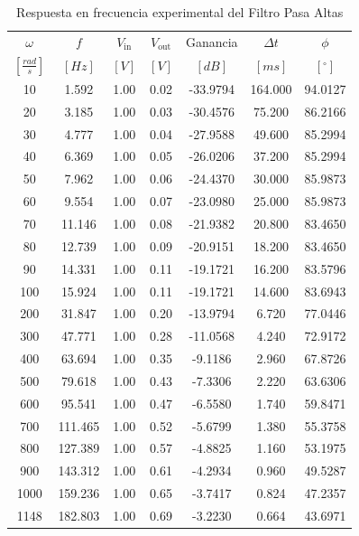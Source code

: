 \documentclass{article}
\begin{document}
\begin{table}[H]
\centering
\caption{Respuesta en frecuencia experimental del Filtro Pasa Altas}
\label{tab:filtro_pasaaltas}
\begin{tabular}{ccccccc}
    \toprule
\(\omega\) & \(f\) & \(V_{\text{in}}\) & \(V_{\text{out}}\) & Ganancia & \(\Delta t\) & \(\phi\) \\
\([\frac{rad}{s}]\) & $[Hz]$ & $[V]$ & $[V]$ & $[dB]$ & $[ms]$ & \ $[^\circ]$\ \\
\midrule
10    &    1.592 & 1.00 & 0.02 & -33.9794 & 164.000 & 94.0127 \\
20    &    3.185 & 1.00 & 0.03 & -30.4576 &  75.200 & 86.2166 \\
30    &    4.777 & 1.00 & 0.04 & -27.9588 &  49.600 & 85.2994 \\
40    &    6.369 & 1.00 & 0.05 & -26.0206 &  37.200 & 85.2994 \\
50    &    7.962 & 1.00 & 0.06 & -24.4370 &  30.000 & 85.9873 \\
60    &    9.554 & 1.00 & 0.07 & -23.0980 &  25.000 & 85.9873 \\
70    &   11.146 & 1.00 & 0.08 & -21.9382 &  20.800 & 83.4650 \\
80    &   12.739 & 1.00 & 0.09 & -20.9151 &  18.200 & 83.4650 \\
90    &   14.331 & 1.00 & 0.11 & -19.1721 &  16.200 & 83.5796 \\
100   &   15.924 & 1.00 & 0.11 & -19.1721 &  14.600 & 83.6943 \\
200   &   31.847 & 1.00 & 0.20 & -13.9794 &   6.720 & 77.0446 \\
300   &   47.771 & 1.00 & 0.28 & -11.0568 &   4.240 & 72.9172 \\
400   &   63.694 & 1.00 & 0.35 &  -9.1186 &   2.960 & 67.8726 \\
500   &   79.618 & 1.00 & 0.43 &  -7.3306 &   2.220 & 63.6306 \\
600   &   95.541 & 1.00 & 0.47 &  -6.5580 &   1.740 & 59.8471 \\
700   &  111.465 & 1.00 & 0.52 &  -5.6799 &   1.380 & 55.3758 \\
800   &  127.389 & 1.00 & 0.57 &  -4.8825 &   1.160 & 53.1975 \\
900   &  143.312 & 1.00 & 0.61 &  -4.2934 &   0.960 & 49.5287 \\
1000  &  159.236 & 1.00 & 0.65 &  -3.7417 &   0.824 & 47.2357 \\
1148  &  182.803 & 1.00 & 0.69 &  -3.2230 &   0.664 & 43.6971 \\

\end{tabular}
\end{table}
\end{document}
